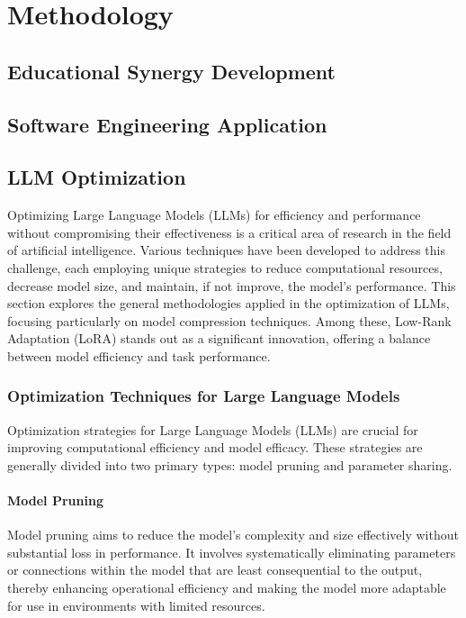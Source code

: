 \chapter{Methodology}

\section{Educational Synergy Development}

\section{Software Engineering Application}

\section{LLM Optimization}
    Optimizing Large Language Models (LLMs) for efficiency and performance without compromising their effectiveness is a critical area of research in the field of artificial intelligence. Various techniques have been developed to address this challenge, each employing unique strategies to reduce computational resources, decrease model size, and maintain, if not improve, the model's performance. This section explores the general methodologies applied in the optimization of LLMs, focusing particularly on model compression techniques. Among these, Low-Rank Adaptation (LoRA) stands out as a significant innovation, offering a balance between model efficiency and task performance.

    \subsection{Optimization Techniques for Large Language Models}
        Optimization strategies for Large Language Models (LLMs) are crucial for improving computational efficiency and model efficacy. These strategies are generally divided into two primary types: model pruning and parameter sharing.

        \subsubsection{Model Pruning}
        Model pruning aims to reduce the model's complexity and size effectively without substantial loss in performance. It involves systematically eliminating parameters or connections within the model that are least consequential to the output, thereby enhancing operational efficiency and making the model more adaptable for use in environments with limited resources.

